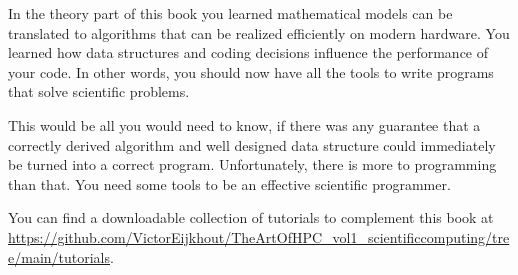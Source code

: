 
In the theory part of this book you learned mathematical models can be
translated to algorithms that can be realized efficiently on modern
hardware. You learned how data structures and coding decisions
influence the performance of your code. In other words, you should now
have all the tools to write programs that solve scientific problems.

This would be all you would need to know,
if there was any guarantee that a correctly derived algorithm and
well designed data structure could immediately be turned into a
correct program.
Unfortunately, there is more to programming than that.
You need some tools to be an effective scientific
programmer.

You can find a downloadable collection of tutorials to complement this
book
at \url{https://github.com/VictorEijkhout/TheArtOfHPC_vol1_scientificcomputing/tree/main/tutorials}.

